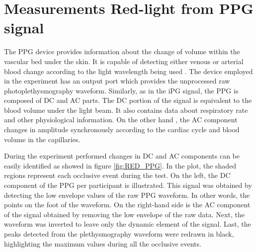 \section{Measurements Red-light from PPG signal}
\label{section results 8}
The PPG device provides information about the change of volume within the vascular bed under the skin. It is capable of detecting either venous or arterial blood change according to the light wavelength being used . The device employed in the experiment has an output port which provides the unprocessed raw photoplethysmography waveform. Similarly, as in the iPG signal, the PPG is composed of DC and AC parts. The DC portion of the signal is equivalent to the blood volume under the light beam. It also contains data about respiratory rate and other physiological information. On the other hand , the AC component changes in amplitude synchronously according to the cardiac cycle and blood volume in the capillaries. 

During the experiment performed changes in DC and AC components can be easily identified  as showed in figure \ref{fig:RED_PPG}. In the plot, the shaded regions represent each occlusive event during the test. On the left, the DC component of the PPG per participant is illustrated. This signal was obtained by detecting the low envelope values of the raw PPG waveform. In other words, the points on the foot of the waveform.  On the right-hand side is the AC component of the signal obtained by removing the low envelope of the raw data. Next, the waveform was inverted to leave only the dynamic element of the signal. Last, the peaks detected from the plethysmography waveform were redrawn in black, highlighting the maximum values during all the occlusive events.  

